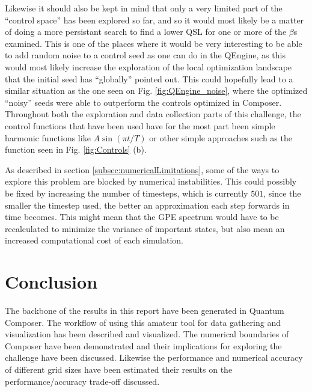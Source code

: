 \documentclass[a4paper, twocolumn]{revtex4-1}
\begin{document}
Likewise it should also be kept in mind that only a very limited part of the ``control space'' has been explored so far, and so it would most likely be a matter of doing a more persistant search to find a lower QSL for one or more of the $\beta$s examined. This is one of the places where it would be very interesting to be able to add random noise to a control seed as one can do in the QEngine, as this would most likely increase the exploration of the local optimization landscape that the initial seed has ``globally'' pointed out. This could hopefully lead to a similar situation as the one seen on Fig. \ref{fig:QEngine_noise}, where the optimized ``noisy'' seeds were able to outperform the controls optimized in Composer.\\


Throughout both the exploration and data collection parts of this challenge, the control functions that have been used have for the most part been simple harmonic functions like $A\sin(\pi t/T)$ or other simple approaches such as the function seen in Fig. \ref{fig:Controls} (b).


As described in section \ref{subsec:numericalLimitations}, some of the ways to explore this problem are blocked by numerical instabilities. This could possibly be fixed by increasing the number of timesteps, which is currently $501$, since the smaller the timestep used, the better an approximation each step forwards in time becomes. This might mean that the GPE spectrum would have to be recalculated to minimize the variance of important states, but also mean an increased computational cost of each simulation.

\section{Conclusion}\label{sec:conclusion}
The backbone of the results in this report have been generated in Quantum Composer. The workflow of using this amateur tool for data gathering and visualization has been described and visualized. %
The numerical boundaries of Composer have been demonstrated and their implications for exploring the challenge have been discussed. Likewise the performance and numerical accuracy of different grid sizes have been estimated their results on the performance/accuracy trade-off discussed.
\end{document}
